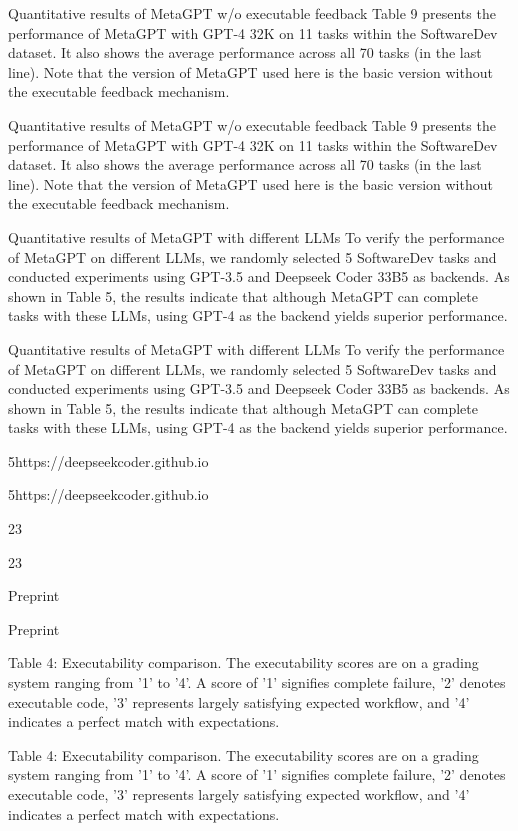 \documentclass[12pt]{article}
\begin{document}
Quantitative results of MetaGPT w/o executable feedback Table 9 presents the performance of
MetaGPT with GPT-4 32K on 11 tasks within the SoftwareDev dataset. It also shows the average
performance across all 70 tasks (in the last line). Note that the version of MetaGPT used here is the
basic version without the executable feedback mechanism.


Quantitative results of MetaGPT w/o executable feedback Table 9 presents the performance of
MetaGPT with GPT-4 32K on 11 tasks within the SoftwareDev dataset. It also shows the average
performance across all 70 tasks (in the last line). Note that the version of MetaGPT used here is the
basic version without the executable feedback mechanism.


Quantitative results of MetaGPT with different LLMs To verify the performance of MetaGPT
on different LLMs, we randomly selected 5 SoftwareDev tasks and conducted experiments using
GPT-3.5 and Deepseek Coder 33B5 as backends. As shown in Table 5, the results indicate that
although MetaGPT can complete tasks with these LLMs, using GPT-4 as the backend yields superior
performance.


Quantitative results of MetaGPT with different LLMs To verify the performance of MetaGPT
on different LLMs, we randomly selected 5 SoftwareDev tasks and conducted experiments using
GPT-3.5 and Deepseek Coder 33B5 as backends. As shown in Table 5, the results indicate that
although MetaGPT can complete tasks with these LLMs, using GPT-4 as the backend yields superior
performance.


5https://deepseekcoder.github.io


5https://deepseekcoder.github.io


23


23


Preprint


Preprint


Table 4: Executability comparison. The executability scores are on a grading system ranging from
’1’ to ’4’. A score of ’1’ signifies complete failure, ’2’ denotes executable code, ’3’ represents
largely satisfying expected workflow, and ’4’ indicates a perfect match with expectations.


Table 4: Executability comparison. The executability scores are on a grading system ranging from
’1’ to ’4’. A score of ’1’ signifies complete failure, ’2’ denotes executable code, ’3’ represents
largely satisfying expected workflow, and ’4’ indicates a perfect match with expectations.
\end{document}
